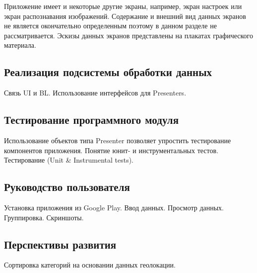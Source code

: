 Приложение имеет и некоторые другие экраны, например,
экран настроек или экран распознавания изображений.
Содержание и внешний вид данных экранов не является
окончательно определенным поэтому в данном разделе не рассматривается.
Эскизы данных экранов представлены на плакатах графического материала.



\subsection{Реализация подсистемы обработки данных}
\label{subsec:implementation_bl}

Связь UI и BL. Использование интерфейсов для Presenters.



\subsection{Тестирование программного модуля}

Использование объектов типа Presenter позволяет упростить
тестирование компонентов приложения.
Понятие юнит- и инструментальных тестов.
Тестирование (Unit \& Instrumental tests).

\subsection{Руководство пользователя}

Установка приложения из Google Play.
Ввод данных. Просмотр данных. Группировка.
Скриншоты.

\subsection{Перспективы развития}

Сортировка категорий на основании данных геолокации.
